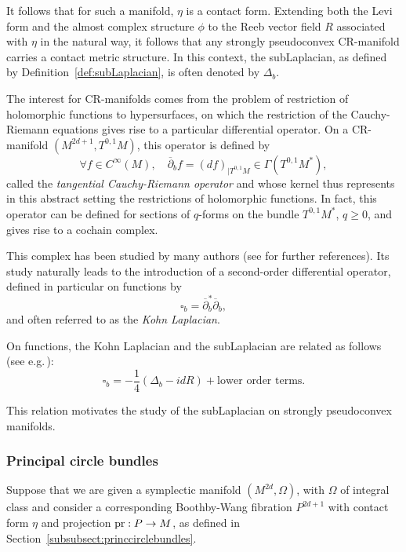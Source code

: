 \documentclass[12pt,a4paper]{amsart}
\theoremstyle{plain}
\theoremstyle{definition}
\theoremstyle{remark}
\numberwithin{equation}{section}
\theoremstyle{definition}
\def \pr{{\rm pr}}
\numberwithin{equation}{section}
\begin{document}
It follows that for such a manifold, $\eta$ is a contact form. Extending both the Levi form and the almost complex structure $\phi$ to the Reeb vector field $R$ associated with $\eta$ in the natural way, it follows that any strongly pseudoconvex CR-manifold carries a contact metric structure.
In this context, the subLaplacian, as defined by Definition~\ref{def:subLaplacian}, is often denoted by $\Delta_b$.

\vspace{0.25cm}

The interest for CR-manifolds comes from the problem of restriction of holomorphic functions to hypersurfaces, on which the restriction of the Cauchy-Riemann equations gives rise to a particular differential operator. On a CR-manifold $(M^{2d+1},T^{0,1}M)$, this operator is defined by
\begin{equation*}
    \forall f\in C^\infty(M),\quad \overline{\partial}_bf = (df)_{|T^{0,1}M}\in\Gamma(T^{0,1}M^*),
\end{equation*}
called the \emph{tangential Cauchy-Riemann operator} and whose kernel thus represents in this abstract setting the restrictions of holomorphic functions. In fact, this operator can be defined for sections of $q$-forms on the bundle $T^{0,1}M^*$, $q\geq 0$, and gives rise to a cochain complex. 

This complex has been studied by many authors (see \cite{DT,FolKohn} for further references). Its study naturally leads to the introduction of a second-order differential operator, defined in particular on functions by
\begin{equation*}
    \square_b = \overline{\partial}_b^*\overline{\partial}_b,
\end{equation*}
and often referred to as the \emph{Kohn Laplacian}.

On functions, the Kohn Laplacian and the subLaplacian are related as follows (see e.g.\,\cite{Ep}):
\begin{equation*}
    \square_b = -\frac{1}{4}\left(\Delta_b -idR \right) + \mbox{lower order terms}.
\end{equation*}

This relation motivates the study of the subLaplacian on strongly pseudoconvex manifolds.

\subsubsection{Principal circle bundles} 

Suppose that we are given a symplectic manifold $(M^{2d},\Omega)$, with $\Omega$ of integral class and consider a corresponding Boothby-Wang fibration $P^{2d+1}$ with contact form $\eta$ and projection $\pr: P\rightarrow M$, as defined in Section~\ref{subsubsect:princcirclebundles}.
\end{document}
